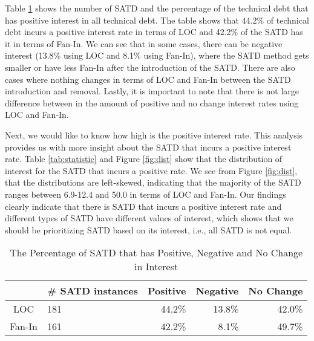 
Table \ref{tab:percentage} shows the number of SATD and the percentage of the technical debt that has positive interest in all technical debt. The table shows that 44.2\% of technical debt incurs a positive interest rate in terms of LOC and 42.2\% of the SATD has it in terms of Fan-In. We can see that in some cases, there can be negative interest (13.8\% using LOC and 8.1\% using Fan-In), where the SATD method gets smaller or have less Fan-In after the introduction of the SATD. There are also cases where nothing changes in terms of LOC and Fan-In between the SATD introduction and removal. Lastly, it is important to note that there is not large difference between in the amount of positive and no change interest rates using LOC and Fan-In. 

Next, we would like to know how high is the positive interest rate. This analysis provides us with more insight about the SATD that incurs a positive interest rate.
Table \ref{tab:statistic} and Figure \ref{fig:dist} show that the distribution of interest for the SATD that incurs a positive rate.  We see from Figure \ref{fig:dist}, that the distributions are left-skewed, indicating that the majority of the SATD ranges between 6.9-12.4 and 50.0 in terms of LOC and Fan-In. Our findings clearly indicate that there is SATD that incurs a positive interest rate and different types of SATD have different values of interest, which shows that we should be prioritizing SATD based on its interest, i.e., all SATD is not equal.



\begin{table}[tb]
  \caption{The Percentage of SATD that has Positive, Negative and No Change in Interest}
  \label{tab:percentage}
  \centering

  \begin{tabular}{c|p{0.45in}|rrr}
  \hline
        & \textbf{\# SATD instances} & \textbf{Positive} & \textbf{Negative} & \textbf{No Change} \\
  \hline
   LOC  & 181 &  44.2\%  &  13.8\% & 42.0\%\\
Fan-In  & 161 &  42.2\%  &  8.1\% & 49.7\%\\
  \hline
  \end{tabular}
\end{table}

